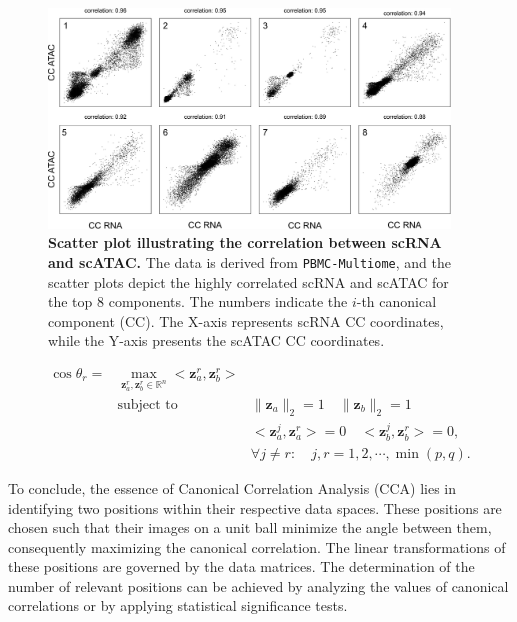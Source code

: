 \begin{figure}[!ht]
	\centering
	\includegraphics[width=0.95\textwidth]{CC_corrlation_scatter/fig}
	\vspace{0.1cm}
	\caption[Scatter plot illustrating the correlation between scRNA and scATAC.]{\textbf{Scatter plot illustrating the correlation between scRNA and scATAC.} The data is derived from \texttt{PBMC-Multiome}, and the scatter plots depict the highly correlated scRNA and scATAC for the top 8 components. The numbers indicate the $i$-th canonical component (CC). The X-axis represents scRNA CC coordinates, while the Y-axis presents the scATAC CC coordinates.}
	\label{fig:CC_corrlation_scatter}
\end{figure}

\begin{equation}
\begin{aligned}
\cos \theta_r = &\underset{{\mathbf z}_a^r, {\mathbf z}_b^r \in\mathbb{R}^n}{\max}<{\mathbf z}_a^r, {\mathbf z}_b^r>\\
                &\text{subject to  } & \|{\mathbf z}_a\|_2=1\quad \|{\mathbf z}_b\|_2=1\\
				  & & <{\mathbf z}_a^j, {\mathbf z}_a^r>=0\quad <{\mathbf z}_b^j, {\mathbf z}_b^r>=0,\\
				  & & \forall j \neq r: \quad j,r = 1,2,\cdots,\min(p,q).
\end{aligned}
\end{equation}

 To conclude, the essence of Canonical Correlation Analysis (CCA) lies in identifying two positions within their respective data spaces. These positions are chosen such that their images on a unit ball minimize the angle between them, consequently maximizing the canonical correlation. The linear transformations of these positions are governed by the data matrices. The determination of the number of relevant positions can be achieved by analyzing the values of canonical correlations or by applying statistical significance tests.


